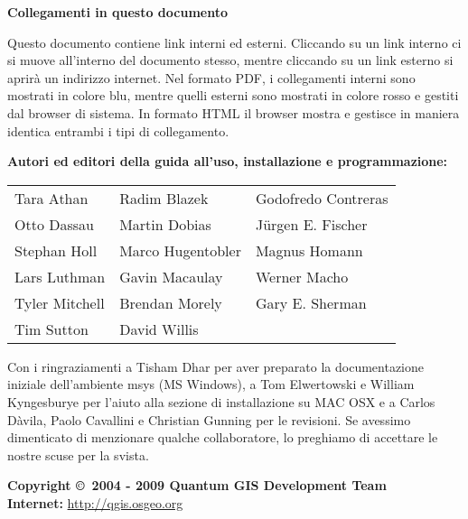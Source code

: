 \textbf{Collegamenti in questo documento}

Questo documento contiene link interni ed esterni. Cliccando su un
link interno ci si muove all'interno del documento stesso, mentre
cliccando su un link esterno si aprirà un indirizzo internet. Nel
formato PDF, i collegamenti interni sono mostrati in colore blu,
mentre quelli esterni sono mostrati in colore rosso e gestiti dal
browser di sistema. In formato HTML il browser mostra e gestisce in
maniera identica entrambi i tipi di collegamento.

\begin{flushleft}
\textbf{Autori ed editori della guida all'uso, installazione e programmazione:}
 
\begin{tabular}{p{5cm} p{5cm} p{5cm}}
Tara Athan & Radim Blazek & Godofredo Contreras \\
Otto Dassau & Martin Dobias & J\"urgen E. Fischer \\ 
Stephan Holl & Marco Hugentobler & Magnus Homann \\ 
Lars Luthman & Gavin Macaulay & Werner Macho \\
Tyler Mitchell & Brendan Morely & Gary E. Sherman \\ 
Tim Sutton & David Willis & \\
\end{tabular}
\end{flushleft}

Con i ringraziamenti a Tisham Dhar per aver preparato la documentazione
iniziale dell'ambiente msys (MS Windows), a Tom Elwertowski e William
Kyngesburye per l'aiuto alla sezione di installazione su MAC OSX e
a Carlos Dàvila, Paolo Cavallini e Christian Gunning per le revisioni.
Se avessimo dimenticato di menzionare qualche collaboratore, lo preghiamo
di accettare le nostre scuse per la svista.

\textbf{Copyright \copyright~2004 - 2009 Quantum GIS Development Team} \\
\textbf{Internet:} \url{http://qgis.osgeo.org}


